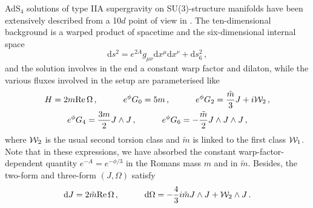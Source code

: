 \documentclass[11pt, a4paper]{article}
\newcommand{\dd}{\text{d}}
\newcommand{\W}{{\cal W}}
\renewcommand{\Re}{{\rm Re}\,}
\begin{document}
AdS$_4$ solutions of type IIA supergravity on SU(3)-structure manifolds have been extensively described from a 10$d$ point of view in \cite{Behrndt:2004km,Behrndt:2004mj,Lust:2004ig,Grana:2005jc,Martucci:2005ht,Grana:2006kf,Koerber:2010bx}. The ten-dimensional background is a warped product of spacetime and the six-dimensional internal space
\begin{equation}
\dd s^2=e^{2A}g_{\mu\nu}\dd x^\mu\dd x^\nu+\dd s_6^2\, ,
\end{equation}
%
and the solution involves in the end a constant warp factor and dilaton, while the various fluxes involved in the setup are parameterised like
\begin{equation}
\begin{gathered}
H=2m\Re\Omega\, ,\qquad\quad e^\phi G_0=5m\, ,\qquad\quad e^\phi G_2=\frac{\tilde m}{3}J+i\W_2\, ,\\
e^\phi G_4=\frac{3m}{2}J\wedge J\, ,\qquad\quad e^\phi G_6=-\frac{\tilde m}{2}J\wedge J\wedge J\, ,
\end{gathered}
\end{equation}
%
where $\W_2$ is the usual second torsion class and $\tilde m$ is linked to the first class $\W_1$. Note that in these expressions, we have absorbed the constant warp-factor-dependent quantity $e^{-A}=e^{-\phi/3}$ in the Romans mass $m$ and in $\tilde m$. Besides, the two-form and three-form $(J,\Omega)$ satisfy
\begin{equation}
\dd J=2\tilde m\Re\Omega\, ,\qquad\quad\dd\Omega=-\frac{4}{3}i\tilde mJ\wedge J+\W_2\wedge J\, .
\end{equation}
\end{document}
